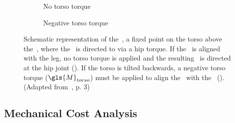     \begin{figure}[htb]%
        \centering%
        \begin{subfigure}{0.5\linewidth}%
            \centering%
            \caption{No torso torque}
            \label{fig:no-torso-torque}
        \end{subfigure}%
        \hfil%
        \begin{subfigure}{0.5\linewidth}%
            \centering%
            \caption{Negative torso torque}
            \label{fig:negative-torso-torque}
        \end{subfigure}%
        \caption{Schematic representation of the~, a fixed point on the torso above the~, where the~ is directed to via a hip torque. If the~ is aligned with the leg, no torso torque is applied and the resulting~ is directed at the hip joint (). If the torso is tilted backwards, a negative torso torque ($\gls{M}_{torso}$) must be applied to align the~ with the~ (). (Adapted from~\cite{Maus2010}, p. 3)}%
        \label{fig:virtual-pivot-point}%
    \end{figure}%

    \subsection{Mechanical Cost Analysis}

